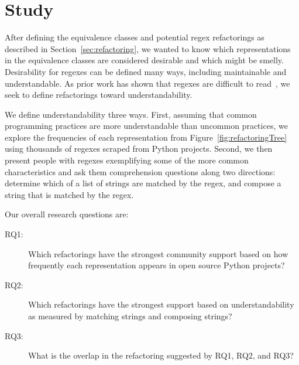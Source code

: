 \section{Study}
\label{sec:study}
After defining the equivalence classes and potential  regex refactorings as described in Section~\ref{sec:refactoring}, we wanted to know which representations in the equivalence classes  are considered desirable and which might be smelly. Desirability for regexes can be defined many ways, including maintainable and understandable. As prior work has shown that regexes are difficult to read~\cite{}, we seek to define refactorings toward understandability.

We define understandability three ways. First, assuming that common programming practices are more understandable than uncommon practices, we explore the frequencies of each representation from Figure~\ref{fig:refactoringTree} using thousands of regexes scraped from Python projects. Second, we then present people with regexes exemplifying some of the more common characteristics and ask them comprehension questions along two directions: determine which of a list of strings are matched by the regex, and compose a string that is matched by the regex.

Our overall research questions are:
\begin{description}
\item[RQ1:] Which refactorings have the strongest community support based on how frequently each representation appears in open source Python projects?
\item[RQ2:] Which refactorings have the strongest support based on understandability as measured by matching strings and composing strings?
\item[RQ3:] What is the overlap in the refactoring suggested by RQ1, RQ2, and RQ3?
\end{description}



%
%
%
%
%
%
%

